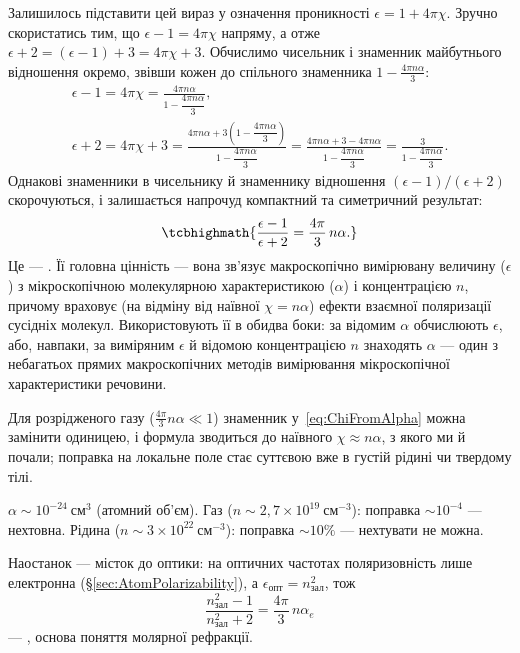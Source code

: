 Залишилось підставити цей вираз у означення проникності $\epsilon = 1+4\pi\chi$. Зручно скористатись тим, що $\epsilon - 1 = 4\pi\chi$ напряму, а
отже $\epsilon + 2 = (\epsilon-1) + 3 = 4\pi\chi + 3$. Обчислимо чисельник і знаменник майбутнього відношення окремо, звівши кожен до спільного
знаменника $1-\frac{4\pi n\alpha}{3}$:
\begin{multline*}
	\epsilon - 1 = 4\pi\chi = \frac{4\pi n\alpha}{1-\dfrac{4\pi n\alpha}{3}},
	\\
	\epsilon + 2 = 4\pi\chi + 3 = \frac{4\pi n\alpha + 3\left(1-\dfrac{4\pi n\alpha}{3}\right)}{1-\dfrac{4\pi n\alpha}{3}}
	= \frac{4\pi n\alpha + 3 - 4\pi n\alpha}{1-\dfrac{4\pi n\alpha}{3}} = \frac{3}{1-\dfrac{4\pi n\alpha}{3}}.
\end{multline*}
Однакові знаменники в чисельнику й знаменнику відношення $(\epsilon-1)/(\epsilon+2)$ скорочуються, і залишається напрочуд компактний та симетричний
результат:
\begin{equation}\label{eq:ClausiusMossotti}
	\tcbhighmath{
		\frac{\epsilon - 1}{\epsilon + 2} = \frac{4\pi}{3}\, n\alpha.
	}
\end{equation}
Це --- . Її головна цінність --- вона  зв'язує макроскопічно вимірювану величину ($\epsilon$) з
мікроскопічною молекулярною характеристикою ($\alpha$) і концентрацією $n$, причому враховує (на відміну від наївної $\chi = n\alpha$) ефекти
взаємної поляризації сусідніх молекул. Використовують її в обидва боки: за відомим $\alpha$ обчислюють $\epsilon$, або, навпаки, за виміряним
$\epsilon$ й відомою концентрацією $n$ знаходять $\alpha$ --- один з небагатьох прямих макроскопічних методів вимірювання мікроскопічної
характеристики речовини.

Для розрідженого газу ($\frac{4\pi}{3}n\alpha\ll1$) знаменник у~\eqref{eq:ChiFromAlpha} можна замінити одиницею, і формула зводиться до наївного
$\chi\approx n\alpha$, з якого ми й почали; поправка на локальне поле стає суттєвою вже в густій рідині чи твердому тілі.

\begin{Attention}
	 $\alpha \sim 10^{-24}\ \text{см}^3$ (атомний об'єм). Газ ($n\sim2{,}7\times10^{19}\ \text{см}^{-3}$): поправка $\sim10^{-4}$ ---
	нехтовна. Рідина ($n\sim3\times10^{22}\ \text{см}^{-3}$): поправка $\sim10\%$ --- нехтувати не можна.
\end{Attention}

Наостанок --- місток до оптики: на оптичних частотах поляризовність лише електронна (\S\ref{sec:AtomPolarizability}), а $\epsilon_\text{опт} =
n_\text{зал}^2$, тож
\begin{equation}\label{eq:LorentzLorenz}
	\frac{n_\text{зал}^2 - 1}{n_\text{зал}^2 + 2} = \frac{4\pi}{3}\, n\alpha_e
\end{equation}
--- , основа поняття молярної рефракції.